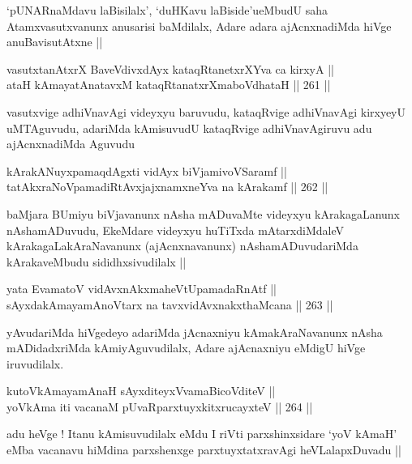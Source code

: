 \begin{artha}
`pUNARnaMdavu laBisilalx', `duHKavu laBiside'ueMbudU saha
  Atamxvasutxvanunx anusarisi baMdilalx, Adare adara ajAcnxnadiMda
  hiVge anuBavisutAtxne ||
\end{artha}

\begin{shl}
vasutxtanAtxrX BaveVdivxdAyx kataqRtanetxrXYva ca kirxyA ||  \\
ataH kAmayatAnatavxM kataqRtanatxrXmaboVdhataH ||  261 ||  
\end{shl}

\begin{artha}
vasutxvige adhiVnavAgi videyxyu baruvudu, kataqRvige adhiVnavAgi
kirxyeyU uMTAguvudu, adariMda kAmisuvudU kataqRvige adhiVnavAgiruvu
adu ajAcnxnadiMda Aguvudu 
\end{artha}

\begin{shl}
kArakANuyxpamaqdAgxti vidAyx biVjamivoVSaramf || \\
tatAkxraNoVpamadiRtAvxjajxnamxneYva na kArakamf ||  262 ||  
\end{shl}

\begin{artha}
baMjara BUmiyu biVjavanunx nAsha mADuvaMte videyxyu kArakagaLanunx
nAshamADuvudu, EkeMdare videyxyu huTiTxda mAtarxdiMdaleV
kArakagaLakAraNavanunx (ajAcnxnavanunx) nAshamADuvudariMda
kArakaveMbudu sididhxsivudilalx ||
\end{artha}

\begin{shl}
yata EvamatoV vidAvxnAkxmaheVtUpamadaRnAtf || \\
sAyxdakAmayamAnoV\s tarx na tavxvidAvxnakxthaMcana ||  263 ||  
\end{shl}

\begin{artha}
yAvudariMda hiVgedeyo adariMda jAcnaxniyu kAmakAraNavanunx nAsha mADidadxriMda kAmiyAguvudilalx, Adare ajAcnaxniyu eMdigU hiVge iruvudilalx.
\end{artha}

\begin{shl}
kutoV\s kAmayamAnaH sAyxditeyxVvamaBicoVditeV || \\
yoV\s kAma iti vacanaM pUvaRparxtuyxkitxrucayxteV ||  264 ||  
\end{shl}

\begin{artha}
adu heVge ! Itanu kAmisuvudilalx eMdu I riVti parxshinxsidare `yoV\s
kAmaH' eMba vacanavu hiMdina parxshenxge parxtuyxtatxravAgi
heVLalapxDuvadu || 
\end{artha}

